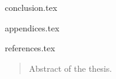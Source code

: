 \documentclass[a4paper,11px]{article}
\begin{document}
\newpage



{conclusion.tex}

\newpage



{appendices.tex}

\newpage




{references.tex}

\newpage



\begin{latin}
\begin{abstract}
Abstract of the thesis.
\end{abstract}
\end{latin}
\newpage
\end{document}
